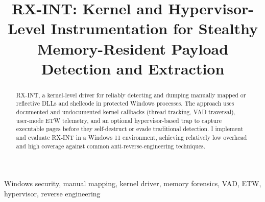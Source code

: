 \documentclass[conference]{IEEEtran}
\begin{document}
\title{RX-INT: Kernel and Hypervisor-Level Instrumentation for Stealthy Memory-Resident Payload Detection and Extraction}

\author{%
}

\maketitle

\begin{abstract}
RX-INT, a kernel-level driver for reliably detecting and dumping manually mapped or reflective DLLs and shellcode in protected Windows processes. The approach uses documented and undocumented kernel callbacks (thread tracking, VAD traversal), user-mode ETW telemetry, and an optional hypervisor-based trap to capture executable pages before they self-destruct or evade traditional detection. I implement and evaluate RX-INT in a Windows 11 environment, achieving relatively low overhead and high coverage against common anti-reverse-engineering techniques.
\end{abstract}

\begin{IEEEkeywords}
Windows security, manual mapping, kernel driver, memory forensics, VAD, ETW, hypervisor, reverse engineering
\end{IEEEkeywords}



\end{document}
